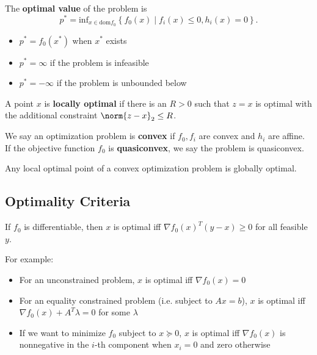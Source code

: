 \documentclass[11pt]{article}
\begin{document}
The \textbf{optimal value} of the problem is 
\[ p^* = \mathrm{inf}_{x \in \mathrm{dom}f_0} \left\{ f_0(x) \mid f_i(x) \leq 0, h_i(x) = 0 \right\}. \] 
\begin{itemize}
    \item $p^* = f_0(x^*)$ when $x^*$ exists
    \item $p^* = \infty$ if the problem is infeasible
    \item $p^* = -\infty$ if the problem is unbounded below
\end{itemize}

A point $x$ is \textbf{locally optimal} if there is an $R > 0$ such that $z = x$ is optimal with the additional constraint $\norm{z-x}_2 \leq R$. \par 

We say an optimization problem is \textbf{convex} if $f_0, f_i$ are convex and $h_i$ are affine. If the objective function $f_0$ is \textbf{quasiconvex}, we say the problem is quasiconvex. \par 
Any local optimal point of a convex optimization problem is globally optimal.

\subsection{Optimality Criteria} 
If $f_0$ is differentiable, then $x$ is optimal iff $\nabla f_0(x)^T(y-x) \geq 0$ for all feasible $y$. \par 
For example: 
\begin{itemize}
    \item For an unconstrained problem, $x$ is optimal iff $\nabla f_0(x) = 0$
    \item For an equality constrained problem (i.e. subject to $Ax=b$), $x$ is optimal iff $\nabla f_0(x) + A^T\lambda = 0$ for some $\lambda$
    \item If we want to minimize $f_0$ subject to $x \succeq 0$, $x$ is optimal iff $\nabla f_0(x)$ is nonnegative in the $i$-th component when $x_i = 0$ and zero otherwise
\end{itemize}
\end{document}
